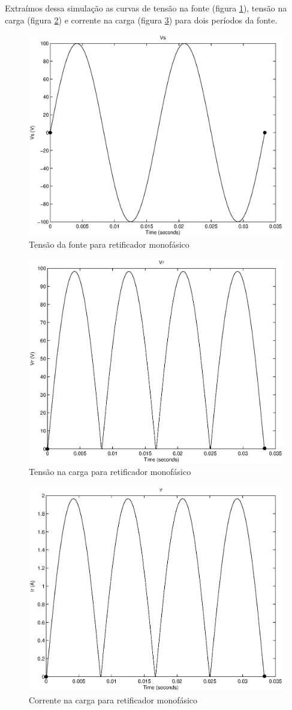\documentclass{report}
\begin{document}
Extraímos dessa simulação as curvas de tensão na fonte (figura \ref{fig:mvs}), tensão na carga (figura \ref{fig:mvr}) e corrente na carga (figura \ref{fig:mir}) para dois períodos da fonte.
\begin{figure}[H]
	\centering
	\includegraphics[width=0.7\linewidth]{matlab/mono_vs}
	\caption{Tensão da fonte para retificador monofásico}
	\label{fig:mvs}
\end{figure}
\begin{figure}[H]
	\centering
	\includegraphics[width=0.7\linewidth]{matlab/mono_vr}
	\caption{Tensão na carga para retificador monofásico}
	\label{fig:mvr}
\end{figure}
\begin{figure}[H]
	\centering
	\includegraphics[width=0.7\linewidth]{matlab/mono_ir}
	\caption{Corrente na carga para retificador monofásico}
	\label{fig:mir}
\end{figure}
\end{document}
